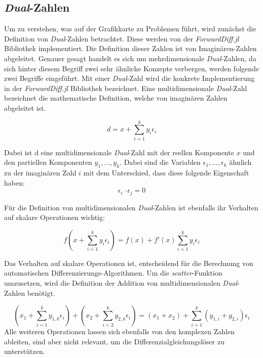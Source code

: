 \subsection{\textit{Dual}-Zahlen} \label{sec:dual_zahlen}

Um zu verstehen, was auf der Grafikkarte zu Problemen führt, 
wird zunächst die Definition von \textit{Dual}-Zahlen betrachtet.
Diese werden von der \textit{ForwardDiff.jl} Bibliothek \cite{juliaForwardDiffPackage}
implementiert. 
Die Definition dieser Zahlen ist von Imaginären-Zahlen abgeleitet.
Genauer gesagt handelt es sich um mehrdimensionale \textit{Dual}-Zahlen, 
da sich hinter diesem Begriff zwei sehr ähnliche Konzepte verbergen, 
werden folgende zwei Begriffe eingeführt.
Mit einer \textit{Dual}-Zahl wird die konkrete Implementierung in der \textit{ForwardDiff.jl} Bibliothek \cite{juliaForwardDiffPackage} bezeichnet.
Eine multidimensionale \textit{Dual}-Zahl bezeichnet die mathematische Definition, 
welche von imaginären Zahlen abgeleitet ist.

\begin{equation}
 d = x + \sum_{i = 1}^{k} y_i \epsilon_i 
\end{equation}

Dabei ist d eine multidimensionale \textit{Dual}-Zahl mit der reellen Komponente $x$ 
und den partiellen Komponenten $y_1, ..., y_k$.
Dabei sind die Variablen $\epsilon_1, ..., \epsilon_k$ ähnlich zu der imaginären Zahl $i$ mit dem Unterschied, dass diese folgende Eigenschaft haben:
\begin{equation}
 \epsilon_i \cdot \epsilon_j = 0
\end{equation}

Für die Definition von multidimensionalen \textit{Dual}-Zahlen \cite{juliaForwardDiffPackage}
ist ebenfalls ihr Verhalten auf skalare Operationen wichtig:

\begin{equation}
 f( x + \sum_{i = 1}^{k} y_i \epsilon_i  ) = f(x) +  f'(x) \sum_{i = 1}^{k} y_i \epsilon_i
\end{equation}

Das Verhalten auf skalare Operationen ist, entscheidend 
für die Berechnung von automatischen Differenzierungs-Algorithmen.
Um die \textit{scatter}-Funktion umzusetzen, 
wird die Definition der Addition von multidimensionalen \textit{Dual}-Zahlen \cite{RecentAdvances} benötigt.

\begin{equation}
(x_1 + \sum_{i = 1}^{k} y_{1,k} \epsilon_i) + ( x_2 + \sum_{i = 2}^{k} y_{2,k} \epsilon_i) = (x_1 + x_2) + \sum_{i = 1}^{k} (y_{1, i} + y_{2, i}) \epsilon_i
\end{equation}
Alle weiteren Operationen lassen sich ebenfalls von den komplexen Zahlen ableiten, 
sind aber nicht relevant, um die Differenzialgleichungslöser zu unterstützen.
